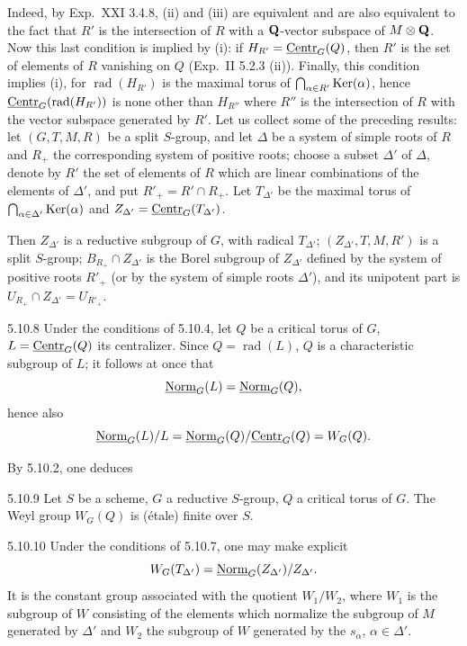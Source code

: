 Indeed, by Exp.~XXI 3.4.8, (ii) and (iii) are equivalent and are also equivalent to the fact that $R'$ is the intersection of $R$ with a $\mathbf{Q}$-vector subspace of $M\otimes\mathbf{Q}$. Now this last condition is implied by (i): if $H_{R'}=\underline{\mathrm{Centr}}_G(Q)$, then $R'$ is the set of elements of $R$ vanishing on $Q$ (Exp.~II 5.2.3 (ii)). Finally, this condition implies (i), for $\operatorname{rad}(H_{R'})$ is the maximal torus of $\bigcap_{\alpha\in R'}\operatorname{Ker}(\alpha)$, hence $\underline{\mathrm{Centr}}_G(\operatorname{rad}(H_{R'}))$ is none other than $H_{R''}$ where $R''$ is the intersection of $R$ with the vector subspace generated by $R'$.
\label{XXII.5.10.7}
Let us collect some of the preceding results: let $(G,T,M,R)$ be a split $S$-group, and let $\Delta$ be a system of simple roots of $R$ and $R_+$ the corresponding system of positive roots; choose a subset $\Delta'$ of $\Delta$, denote by $R'$ the set of elements of $R$ which are linear combinations of the elements of $\Delta'$, and put $R'_+=R'\cap R_+$. Let $T_{\Delta'}$ be the maximal torus of $\bigcap_{\alpha\in\Delta'}\operatorname{Ker}(\alpha)$ and $Z_{\Delta'}=\underline{\mathrm{Centr}}_G(T_{\Delta'})$.

Then $Z_{\Delta'}$ is a reductive subgroup of $G$, with radical $T_{\Delta'}$; $(Z_{\Delta'},T,M,R')$ is a split $S$-group; $B_{R_+}\cap Z_{\Delta'}$ is the Borel subgroup of $Z_{\Delta'}$ defined by the system of positive roots $R'_+$ (or by the system of simple roots $\Delta'$), and its unipotent part is $U_{R_+}\cap Z_{\Delta'}=U_{R'_+}$.
\begin{remark}{5.10.8}\label{XXII.5.10.8}
Under the conditions of 5.10.4, let $Q$ be a critical torus of $G$, $L=\underline{\mathrm{Centr}}_G(Q)$ its centralizer. Since $Q=\operatorname{rad}(L)$, $Q$ is a characteristic subgroup of $L$; it follows at once that
\[
\underline{\mathrm{Norm}}_G(L)=\underline{\mathrm{Norm}}_G(Q),
\]
hence also
\[
\underline{\mathrm{Norm}}_G(L)/L=\underline{\mathrm{Norm}}_G(Q)/\underline{\mathrm{Centr}}_G(Q)=W_G(Q).
\]
\end{remark}
By 5.10.2, one deduces
\begin{proposition}{5.10.9}\label{XXII.5.10.9}
Let $S$ be a scheme, $G$ a reductive $S$-group, $Q$ a critical torus of $G$. The Weyl group $W_G(Q)$ is (\'etale) finite over $S$.
\end{proposition}
\begin{remark}{5.10.10}\label{XXII.5.10.10}
Under the conditions of 5.10.7, one may make explicit
\[
W_G(T_{\Delta'})=\underline{\mathrm{Norm}}_G(Z_{\Delta'})/Z_{\Delta'}.
\]
It is the constant group associated with the quotient $W_1/W_2$, where $W_1$ is the subgroup of $W$ consisting of the elements which normalize the subgroup of $M$ generated by $\Delta'$ and $W_2$ the subgroup of $W$ generated by the $s_\alpha$, $\alpha\in\Delta'$.
\end{remark}


